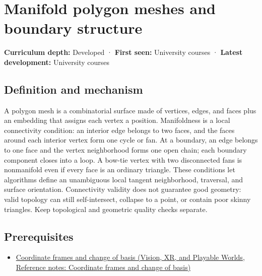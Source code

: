 \hypertarget{appendix-fab348609369}{}\label{referencestart:appendix-fab348609369}
\section{Manifold polygon meshes and boundary structure}\label{appendix-fab348609369-manifold-polygon-meshes-and-boundary-structure}

\textbf{Curriculum depth:} Developed · \textbf{First seen:} University courses · \textbf{Latest development:} University courses

\begin{allmightroledefinition}

\subsection{Definition and mechanism}\label{appendix-fab348609369-definition-and-mechanism}

A polygon mesh is a combinatorial surface made of vertices, edges, and faces plus an embedding that assigns each vertex a position. Manifoldness is a local connectivity condition: an interior edge belongs to two faces, and the faces around each interior vertex form one cycle or fan. At a boundary, an edge belongs to one face and the vertex neighborhood forms one open chain; each boundary component closes into a loop. A bow-tie vertex with two disconnected fans is nonmanifold even if every face is an ordinary triangle. These conditions let algorithms define an unambiguous local tangent neighborhood, traversal, and surface orientation. Connectivity validity does not guarantee good geometry: valid topology can still self-intersect, collapse to a point, or contain poor skinny triangles. Keep topological and geometric quality checks separate.

\end{allmightroledefinition}

\subsection{Prerequisites}\label{appendix-fab348609369-prerequisites}

\begin{itemize}
\tightlist
\item
  \href{../07-Vision-XR-and-Playable-Worlds/main.pdf\#nameddest=appendix-1bae9457dbc3}{Coordinate frames and change of basis (Vision, XR, and Playable Worlds, Reference notes: Coordinate frames and change of basis)}
\end{itemize}

